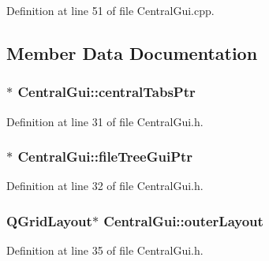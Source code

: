 Definition at line 51 of file Central\-Gui.\-cpp.



\subsection{Member Data Documentation}
\hypertarget{class_central_gui_a8ec49e2c3a7c601bed4a7e4ccf173682}{
\subsubsection[{central\-Tabs\-Ptr}]{$\ast$ Central\-Gui\-::central\-Tabs\-Ptr\hspace{0.3cm}{\ttfamily [private]}}}\label{class_central_gui_a8ec49e2c3a7c601bed4a7e4ccf173682}


Definition at line 31 of file Central\-Gui.\-h.

\hypertarget{class_central_gui_a6abfae93daa17e3af2a814888c9c14cf}{
\subsubsection[{file\-Tree\-Gui\-Ptr}]{$\ast$ Central\-Gui\-::file\-Tree\-Gui\-Ptr\hspace{0.3cm}{\ttfamily [private]}}}\label{class_central_gui_a6abfae93daa17e3af2a814888c9c14cf}


Definition at line 32 of file Central\-Gui.\-h.

\hypertarget{class_central_gui_ab10e8028968ca8d5bf7b2cfe4b257d52}{
\subsubsection[{outer\-Layout}]{\setlength{\rightskip}{0pt plus 5cm}Q\-Grid\-Layout$\ast$ Central\-Gui\-::outer\-Layout\hspace{0.3cm}{\ttfamily [private]}}}\label{class_central_gui_ab10e8028968ca8d5bf7b2cfe4b257d52}


Definition at line 35 of file Central\-Gui.\-h.

